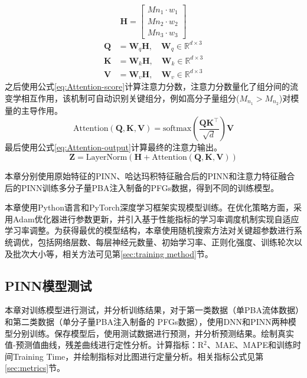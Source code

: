 \begin{equation}
  \mathbf{H} =
  \begin{bmatrix}
    Mn_{1} \cdot w_1 \\
    Mn_{2} \cdot w_2 \\
    Mn_{3} \cdot w_3
  \end{bmatrix} \label{eq:Mn-w-hadamard-slice}
\end{equation}
\begin{align}
  \mathbf{Q} & = \mathbf{W}_q \mathbf{H}, \quad \mathbf{W}_q \in \mathbb{R}^{d \times 3}  \label{eq:Attention-Q} \\
  \mathbf{K} & = \mathbf{W}_k \mathbf{H}, \quad \mathbf{W}_k \in \mathbb{R}^{d \times 3} \label{eq:Attention-K}  \\
  \mathbf{V} & = \mathbf{W}_v \mathbf{H}, \quad \mathbf{W}_v \in \mathbb{R}^{d \times 3} \label{eq:Attention-V}
\end{align}
之后使用公式\eqref{eq:Attention-score}计算注意力分数，注意力分数量化了组分间的流变学相互作用，该机制可自动识别关键组分，例如高分子量组分($M_{n_1} > M_{n_2}$)对模量的主导作用。
\begin{equation}
  \text{Attention}(\mathbf{Q}, \mathbf{K}, \mathbf{V}) = \text{softmax}\left(\frac{\mathbf{Q} \mathbf{K}^\top}{\sqrt{d}}\right) \mathbf{V} \label{eq:Attention-score}
\end{equation}
最后使用公式\eqref{eq:Attention-output}计算最终的注意力输出。
\begin{equation}
  \mathbf{Z} = \text{LayerNorm}(\mathbf{H} + \text{Attention}(\mathbf{Q}, \mathbf{K}, \mathbf{V}))
  \label{eq:Attention-output}
\end{equation}

本章分别使用原始特征的PINN、哈达玛积特征融合后的PINN和注意力特征融合后的PINN训练多分子量PBA注入制备的PFGs数据，得到不同的训练模型。

本章使用Python语言和PyTorch深度学习框架实现模型训练。在优化策略方面，采用Adam优化器进行参数更新，并引入基于性能指标的学习率调度机制实现自适应学习率调整。为获得最优的模型结构，本章使用随机搜索方法对关键超参数进行系统调优，包括网络层数、每层神经元数量、初始学习率、正则化强度、训练轮次以及批次大小等，相关方法可见第\ref{sec:training method}节。

\subsection{PINN模型测试}
本章对训练模型进行测试，并分析训练结果，对于第一类数据（单PBA流体数据）和第二类数据（单分子量PBA注入制备的 PFGs数据），使用DNN和PINN两种模型分别训练。保存模型后，使用测试数据进行预测，并分析预测结果。绘制真实值-预测值曲线，残差曲线进行定性分析。计算指标：R$^2$、MAE、MAPE和训练时间Training Time，并绘制指标对比图进行定量分析。相关指标公式见第\ref{sec:metrics}节。


